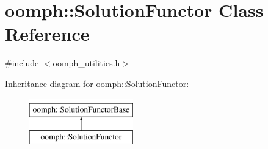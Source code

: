 \hypertarget{classoomph_1_1SolutionFunctor}{}\section{oomph\+:\+:Solution\+Functor Class Reference}
\label{classoomph_1_1SolutionFunctor}


{\ttfamily \#include $<$oomph\+\_\+utilities.\+h$>$}

Inheritance diagram for oomph\+:\+:Solution\+Functor\+:\begin{figure}[H]
\begin{center}
\leavevmode
\includegraphics[height=2.000000cm]{classoomph_1_1SolutionFunctor}
\end{center}
\end{figure}
